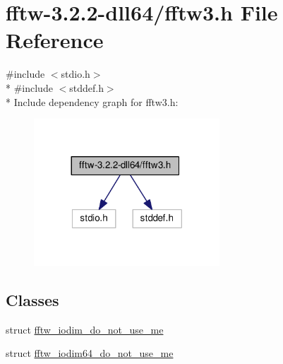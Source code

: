 \hypertarget{fftw-3_82_82-dll64_2fftw3_8h}{\section{fftw-\/3.2.2-\/dll64/fftw3.h File Reference}
\label{fftw-3_82_82-dll64_2fftw3_8h}
}
{\ttfamily \#include $<$stdio.\-h$>$}\\*
{\ttfamily \#include $<$stddef.\-h$>$}\\*
Include dependency graph for fftw3.\-h\-:
\nopagebreak
\begin{figure}[H]
\begin{center}
\leavevmode
\includegraphics[width=197pt]{fftw-3_82_82-dll64_2fftw3_8h__incl}
\end{center}
\end{figure}
\subsection*{Classes}
\begin{DoxyCompactItemize}
\item 
struct \hyperlink{structfftw__iodim__do__not__use__me}{fftw\-\_\-iodim\-\_\-do\-\_\-not\-\_\-use\-\_\-me}
\item 
struct \hyperlink{structfftw__iodim64__do__not__use__me}{fftw\-\_\-iodim64\-\_\-do\-\_\-not\-\_\-use\-\_\-me}
\end{DoxyCompactItemize}
